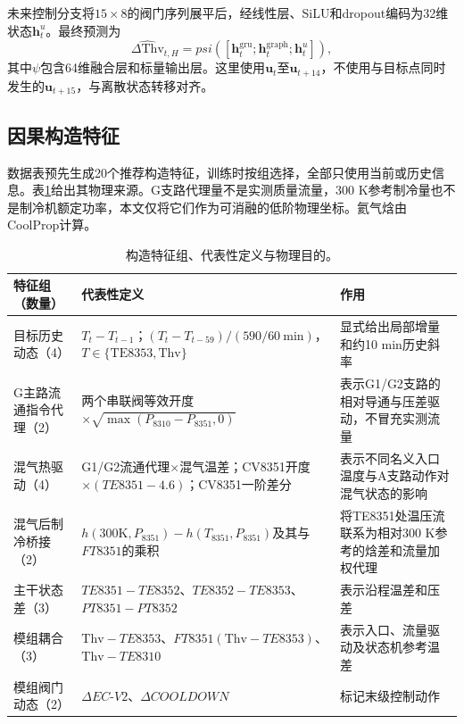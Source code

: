 \documentclass[a4paper,fleqn]{cas-dc}
\newcommand{\Thv}{\mathrm{Thv}}
\newcommand{\vect}[1]{\boldsymbol{#1}}
\begin{document}
未来控制分支将$15\times8$的阀门序列展平后，经线性层、SiLU和dropout编码为32维状态$\vect h_t^u$。最终预测为
\begin{equation}
\widehat{\Delta\Thv}_{t,H}=psi\left(
[\vect h_t^{\mathrm{gru}};\vect h_t^{\mathrm{graph}};\vect h_t^u]
\right),
\end{equation}
其中$\psi$包含64维融合层和标量输出层。这里使用$\vect u_t$至$\vect u_{t+14}$，不使用与目标点同时发生的$\vect u_{t+15}$，与离散状态转移对齐。

\subsection{因果构造特征}

数据表预先生成20个推荐构造特征，训练时按组选择，全部只使用当前或历史信息。表\ref{tab:features}给出其物理来源。G支路代理量不是实测质量流量，300 K参考制冷量也不是制冷机额定功率，本文仅将它们作为可消融的低阶物理坐标。氦气焓由CoolProp计算\citep{bell2014coolprop}。

\begin{table}[t]
\centering
\caption{构造特征组、代表性定义与物理目的。}
\label{tab:features}
\begin{tabularx}{\textwidth}{@{}p{3.0cm}p{6.8cm}X@{}}
\toprule
特征组（数量） & 代表性定义 & 作用 \\
\midrule
目标历史动态（4） & $T_t-T_{t-1}$；$(T_t-T_{t-59})/(590/60\ \mathrm{min})$，$T\in\{\mathrm{TE8353},\Thv\}$ & 显式给出局部增量和约10 min历史斜率 \\
G主路流通指令代理（2） & 两个串联阀等效开度$\times\sqrt{\max(P_{8310}-P_{8351},0)}$ & 表示G1/G2支路的相对导通与压差驱动，不冒充实测流量 \\
混气热驱动（4） & G1/G2流通代理$\times$混气温差；CV8351开度$\times(TE8351-4.6)$；CV8351一阶差分 & 表示不同名义入口温度与A支路动作对混气状态的影响 \\
混气后制冷桥接（2） & $h(300\mathrm{K},P_{8351})-h(T_{8351},P_{8351})$及其与$FT8351$的乘积 & 将TE8351处温压流联系为相对300 K参考的焓差和流量加权代理 \\
主干状态差（3） & $TE8351-TE8352$、$TE8352-TE8353$、$PT8351-PT8352$ & 表示沿程温差和压差 \\
模组耦合（3） & $\Thv-TE8353$、$FT8351(\Thv-TE8353)$、$\Thv-TE8310$ & 表示入口、流量驱动及状态机参考温差 \\
模组阀门动态（2） & $\Delta EC\mbox{-}V2$、$\Delta COOLDOWN$ & 标记末级控制动作 \\
\bottomrule
\end{tabularx}
\end{table}
\end{document}

